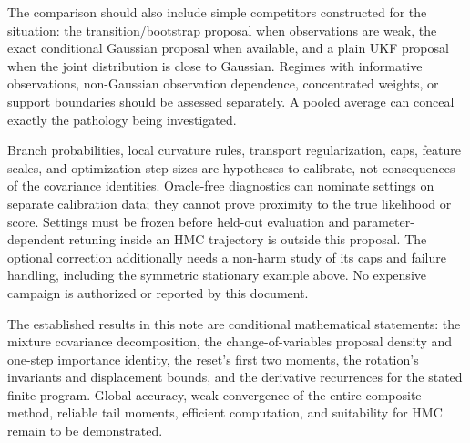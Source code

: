 The comparison should also include simple competitors constructed for
the situation: the transition/bootstrap proposal when observations are
weak, the exact conditional Gaussian proposal when available, and a plain
UKF proposal when the joint distribution is close to Gaussian.
Regimes with informative observations, non-Gaussian observation dependence,
concentrated weights, or support boundaries should be assessed separately.
A pooled average can conceal exactly the pathology being investigated.

Branch probabilities, local curvature rules, transport regularization,
caps, feature scales, and optimization step sizes are hypotheses to
calibrate, not consequences of the covariance identities.
Oracle-free diagnostics can nominate settings on separate calibration data;
they cannot prove proximity to the true likelihood or score.
Settings must be frozen before held-out evaluation and parameter-dependent
retuning inside an HMC trajectory is outside this proposal.
The optional correction additionally needs a non-harm study of its caps
and failure handling, including the symmetric stationary example above.
No expensive campaign is authorized or reported by this document.

The established results in this note are conditional mathematical statements:
the mixture covariance decomposition, the change-of-variables proposal
density and one-step importance identity, the reset's first two moments,
the rotation's invariants and displacement bounds, and the derivative
recurrences for the stated finite program. Global accuracy, weak convergence
of the entire composite method, reliable tail moments, efficient computation,
and suitability for HMC remain to be demonstrated.

